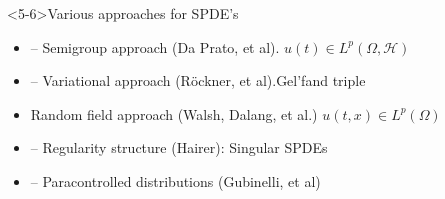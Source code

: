 \documentclass[9pt,table,xcolor=dvipsnames]{beamer}%
\newcommand{\calH}{\mathcal{H}}
\theoremstyle{definition}
\theoremstyle{plain}
\begin{document}
\begin{frame}<5-6>{Various approaches for SPDE's}
\begin{itemize}
  \item -- Semigroup approach (Da Prato, et al). \hfill $u(t)\in L^p(\Omega,\calH)$\\[1em]
  \item[] -- Variational approach (R\"ockner, et al).\hfill Gel'fand triple\\
  \vfill
  \item \alert<6>{Random field approach (Walsh, Dalang, et al.) \hfill $u(t,x)\in L^p(\Omega)$
    }
  \vfill
  \item -- Regularity structure (Hairer): \hfill Singular SPDEs\\[1em]
  \item[] -- Paracontrolled distributions (Gubinelli, et al)
  \pause
\end{itemize}
\end{frame}
\end{document}
